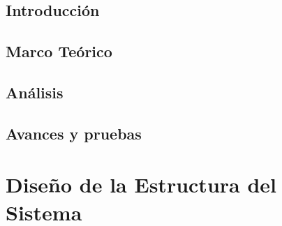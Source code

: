 \documentclass[10pt]{book}
\begin{document}
\thispagestyle{empty}

\maketitle
 

\frontmatter
\tableofcontents
\listoffigures
\listoftables
\mainmatter

 \hideControlVersion

 
\chapter{Introducción}\label{chp:introduccion}
   
\chapter{Marco Teórico}\label{chp:marcoTeorico}
   
\chapter{Análisis}\label{chp:analisis}

\chapter{Avances y pruebas}\label{chp:avancesPruebas}
    
\part{Diseño de la Estructura del Sistema}
\end{document}
